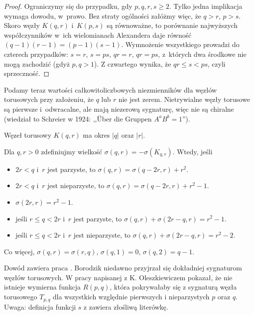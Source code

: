 \begin{proof}
    Ograniczymy się do przypadku, gdy $p, q, r, s \ge 2$.
    Tylko jedna implikacja wymaga dowodu, w~prawo.
    Bez straty ogólności załóżmy więc, że $q > r$, $p > s$.
    Skoro węzły $K(q, r)$ i~$K(p,s)$ są równoważne, to porównanie najwyższych współczynników w~ich wielomianach Alexandera daje równość $(q-1)(r-1) = (p-1)(s-1)$.
    Wymnożenie wszystkiego prowadzi do czterech przypadków: $s = r$, $s = ps$, $qr = r$, $qr = ps$, z~których dwa środkowe nie mogą zachodzić (gdyż $p, q > 1$).
    Z czwartego wynika, że $qr \le s < ps$, czyli sprzeczność.
\end{proof}

Podamy teraz wartości całkowitoliczbowych niezmienników dla węzłów torusowych przy założeniu, że $q$ lub $r$ nie jest zerem.
Nietrywialne węzły torusowe są pierwsze i~odwracalne, ale mają niezerową sygnaturę, więc nie są chiralne (wiedział to Schreier w 1924: ,,Über die Gruppen $A^a B^b = 1$'').

\begin{proposition}
    Węzeł torusowy $K(q, r)$ ma okres $|q|$ oraz $|r|$.
\end{proposition}

\begin{proposition}
    Dla $q, r > 0$ zdefiniujmy wielkość $\sigma(q, r) = - \sigma(K_{q, r})$.
    Wtedy, jeśli
    \begin{itemize}[leftmargin=*]
    \itemsep0em
        \item $2r < q$ i~$r$ jest parzyste, to $\sigma(q, r) = \sigma(q-2r, r) + r^2$.
        \item $2r < q$ i~$r$ jest nieparzyste, to $\sigma(q, r) = \sigma(q-2r, r) + r^2 - 1$.
        \item $\sigma(2r, r) = r^2 - 1$.
        \item jeśli $r \le q < 2r$ i~$r$ jest parzyste, to $\sigma(q, r) + \sigma(2r-q, r) = r^2-1$.
        \item jeśli $r \le q < 2r$ i~$r$ jest nieparzyste, to $\sigma(q, r) + \sigma(2r-q, r) = r^2-2$.
    \end{itemize}
    Co więcej, $\sigma(q, r) = \sigma(r, q)$, $\sigma(q, 1) = 0$, $\sigma(q, 2) = q-1$.
\end{proposition}

Dowód zawiera praca \cite{litherland81}.
Borodzik niedawno przyjrzał się dokładniej sygnaturom węzłów torusowych.
W pracy \cite{borodzik10} napisanej z K. Oleszkiewiczem pokazał, że nie istnieje wymierna funkcja $R(p, q)$, która pokrywałaby się z sygnaturą węzła torusowego $T_{p, q}$ dla wszystkich względnie pierwszych i nieparzystych $p$ oraz $q$.
Uwaga: definicja funkcji $s$ z \cite{borodzik10} zawiera złośliwą literówkę.

